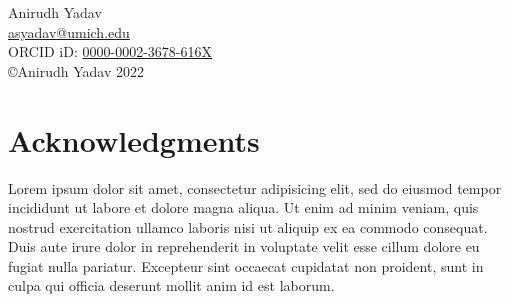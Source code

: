 \begin{center}
\begin{onehalfspacing}
  Anirudh Yadav \\
  \href{mailto:asyadav@umich.edu}{\color{black}asyadav@umich.edu} \\
  ORCID iD: \href{http://orcid.org/0000-0002-3678-616X}{\color{black}0000-0002-3678-616X}\\
  \vspace{0.3in}
  \copyright\;Anirudh Yadav 2022
\end{onehalfspacing}
\end{center}

\vfill
\hspace{0pt}

\clearpage

\listoftodos

\setcounter{page}{2}


\chapter{Acknowledgments}
\begin{onehalfspace}
Lorem ipsum dolor sit amet, consectetur adipisicing elit, sed do eiusmod
tempor incididunt ut labore et dolore magna aliqua. Ut enim ad minim veniam,
quis nostrud exercitation ullamco laboris nisi ut aliquip ex ea commodo
consequat. Duis aute irure dolor in reprehenderit in voluptate velit esse
cillum dolore eu fugiat nulla pariatur. Excepteur sint occaecat cupidatat non
proident, sunt in culpa qui officia deserunt mollit anim id est laborum.
\end{onehalfspace}

